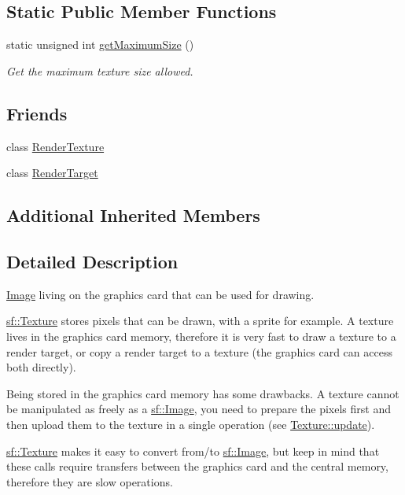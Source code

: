 \subsection*{Static Public Member Functions}
\begin{DoxyCompactItemize}
\item 
static unsigned int \hyperlink{classsf_1_1_texture_a0bf905d487b104b758549c2e9e20a3fb}{get\-Maximum\-Size} ()
\begin{DoxyCompactList}\small\item\em Get the maximum texture size allowed. \end{DoxyCompactList}\end{DoxyCompactItemize}
\subsection*{Friends}
\begin{DoxyCompactItemize}
\item 
class \hyperlink{classsf_1_1_texture_a2548fc9744f5e43e0276d5627ca178de}{Render\-Texture}
\item 
class \hyperlink{classsf_1_1_texture_aa5afc6f82b7b587ed5ada4d227ce32aa}{Render\-Target}
\end{DoxyCompactItemize}
\subsection*{Additional Inherited Members}


\subsection{Detailed Description}
\hyperlink{classsf_1_1_image}{Image} living on the graphics card that can be used for drawing. 

\hyperlink{classsf_1_1_texture}{sf\-::\-Texture} stores pixels that can be drawn, with a sprite for example. A texture lives in the graphics card memory, therefore it is very fast to draw a texture to a render target, or copy a render target to a texture (the graphics card can access both directly).

Being stored in the graphics card memory has some drawbacks. A texture cannot be manipulated as freely as a \hyperlink{classsf_1_1_image}{sf\-::\-Image}, you need to prepare the pixels first and then upload them to the texture in a single operation (see \hyperlink{classsf_1_1_texture_ae4eab5c6781316840b0c50ad08370963}{Texture\-::update}).

\hyperlink{classsf_1_1_texture}{sf\-::\-Texture} makes it easy to convert from/to \hyperlink{classsf_1_1_image}{sf\-::\-Image}, but keep in mind that these calls require transfers between the graphics card and the central memory, therefore they are slow operations.


